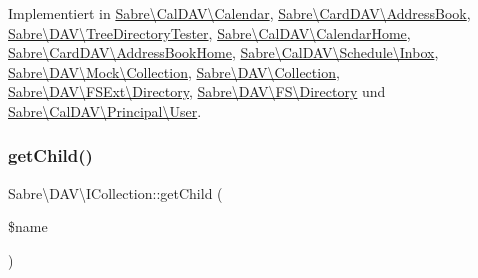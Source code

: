 Implementiert in \mbox{\hyperlink{class_sabre_1_1_cal_d_a_v_1_1_calendar_a5aefe3eda08406957905a989a95cde5d}{Sabre\textbackslash{}\+Cal\+D\+A\+V\textbackslash{}\+Calendar}}, \mbox{\hyperlink{class_sabre_1_1_card_d_a_v_1_1_address_book_acb96c33f5ef4268215b9d6c9bfcb46de}{Sabre\textbackslash{}\+Card\+D\+A\+V\textbackslash{}\+Address\+Book}}, \mbox{\hyperlink{class_sabre_1_1_d_a_v_1_1_tree_directory_tester_a5da227a7e00590c41d809acc7131e455}{Sabre\textbackslash{}\+D\+A\+V\textbackslash{}\+Tree\+Directory\+Tester}}, \mbox{\hyperlink{class_sabre_1_1_cal_d_a_v_1_1_calendar_home_a093e54517bdfc3d347aafa746d03e4dc}{Sabre\textbackslash{}\+Cal\+D\+A\+V\textbackslash{}\+Calendar\+Home}}, \mbox{\hyperlink{class_sabre_1_1_card_d_a_v_1_1_address_book_home_a134a28efb6add7eec8f9e79c21763ea3}{Sabre\textbackslash{}\+Card\+D\+A\+V\textbackslash{}\+Address\+Book\+Home}}, \mbox{\hyperlink{class_sabre_1_1_cal_d_a_v_1_1_schedule_1_1_inbox_a8c56a7ba0178ffd33c6886a248bde08b}{Sabre\textbackslash{}\+Cal\+D\+A\+V\textbackslash{}\+Schedule\textbackslash{}\+Inbox}}, \mbox{\hyperlink{class_sabre_1_1_d_a_v_1_1_mock_1_1_collection_a7d30a56a4eca887ee8ba5f6d819dc5dd}{Sabre\textbackslash{}\+D\+A\+V\textbackslash{}\+Mock\textbackslash{}\+Collection}}, \mbox{\hyperlink{class_sabre_1_1_d_a_v_1_1_collection_af2ab7895780c34b2e0eb4d7c3972d0f3}{Sabre\textbackslash{}\+D\+A\+V\textbackslash{}\+Collection}}, \mbox{\hyperlink{class_sabre_1_1_d_a_v_1_1_f_s_ext_1_1_directory_af0c5ff461938c2cc3ab1b474166a5d57}{Sabre\textbackslash{}\+D\+A\+V\textbackslash{}\+F\+S\+Ext\textbackslash{}\+Directory}}, \mbox{\hyperlink{class_sabre_1_1_d_a_v_1_1_f_s_1_1_directory_a5f0b8f6641480deb70c711d32e33d59b}{Sabre\textbackslash{}\+D\+A\+V\textbackslash{}\+F\+S\textbackslash{}\+Directory}} und \mbox{\hyperlink{class_sabre_1_1_cal_d_a_v_1_1_principal_1_1_user_a7ae49dc82db4732ad0aecc1520a1d909}{Sabre\textbackslash{}\+Cal\+D\+A\+V\textbackslash{}\+Principal\textbackslash{}\+User}}.

\mbox{\label{interface_sabre_1_1_d_a_v_1_1_i_collection_a09f82b07550611752abb149f468b89c2}} 
\subsubsection{\texorpdfstring{get\+Child()}{getChild()}}
{\footnotesize\ttfamily Sabre\textbackslash{}\+D\+A\+V\textbackslash{}\+I\+Collection\+::get\+Child (\begin{DoxyParamCaption}\item[{}]{\$name }\end{DoxyParamCaption})}

